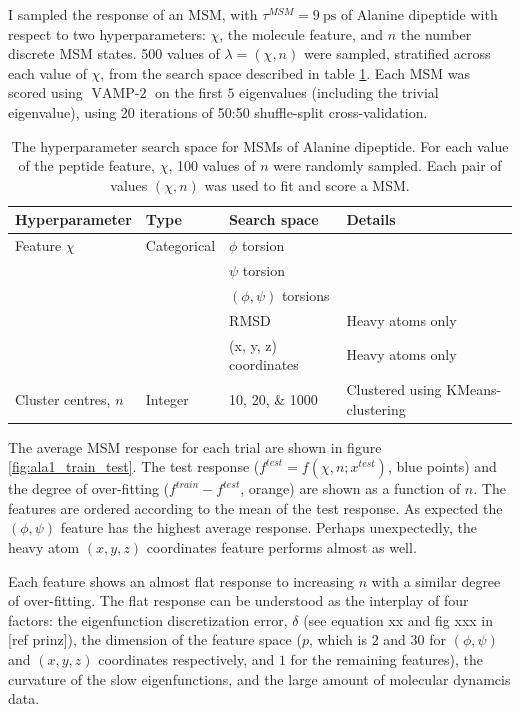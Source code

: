 I sampled the response of an MSM, with $\tau^{MSM}=\SI{9}{\pico\second}$ of Alanine dipeptide with respect to two hyperparameters: $\chi$, the molecule feature, and $n$ the number discrete MSM states. \num{500} values of $\lambda = (\chi, n)$ were sampled, stratified across each value of $\chi$, from the search space described in table \ref{tab:ala2searchspace}. Each MSM was scored using  $\operatorname{VAMP-2}$ on the first $5$ eigenvalues (including the trivial eigenvalue), using \num{20} iterations of 50:50 shuffle-split cross-validation. 

\begin{table}
    \caption{The hyperparameter search space for MSMs of Alanine dipeptide. For each value of the peptide feature, $\chi$, 100 values of $n$ were randomly sampled. Each pair of values $(\chi, n)$ was used to fit and score a MSM.}
    \centering
    \begin{tabularx}{0.9\textwidth}{ |>{\raggedright\arraybackslash}X|l|l| >{\raggedright\arraybackslash}X | } 
    \hline
    \textbf{Hyperparameter} & \textbf{Type} & \textbf{Search space} & \textbf{Details} \\
     \hline\hline
    Feature $\chi$ & Categorical &  $\phi$ torsion &  \\
    & & $\psi$ torsion &  \\ 
    & & $(\phi, \psi)$ torsions &  \\ 
    & & RMSD &  Heavy atoms only\\ 
    & & (x, y, z) coordinates & Heavy atoms only  \\
    \hline 
    Cluster centres, $n$ & Integer & \numlist[list-final-separator = { ... }]{10;20;1000} & Clustered using KMeans-clustering \\
     \hline
    \end{tabularx}
    \label{tab:ala2searchspace}
\end{table}


The average MSM response for each trial are shown in figure \ref{fig:ala1_train_test}.  The test response ($f^{test} = f(\chi, n; x^{test})$, blue points) and the degree of over-fitting ($f^{train} - f^{test}$, orange) are shown as a function of $n$. The  features are ordered according to the  mean of the test response. As expected the  $(\phi, \psi)$ feature has the highest average response. Perhaps unexpectedly, the heavy atom $(x,y,z)$ coordinates feature performs almost as well. 

Each feature shows an almost flat response to increasing $n$ with a similar degree of over-fitting. The flat response can be understood as the interplay of four factors: the eigenfunction discretization error, $\delta$ (see equation xx and fig xxx in [ref prinz]), the dimension of the feature space ($p$, which is $2$ and $30$ for $(\phi, \psi)$ and $(x,y,z)$ coordinates respectively, and $1$ for the remaining features),  the curvature of the slow eigenfunctions, and the large amount of molecular dynamcis data. 

